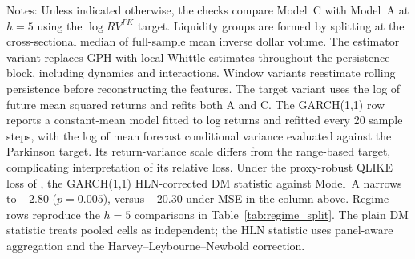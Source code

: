 \begin{table}[p]
\centering
\caption{Robustness Summary: Model~C Relative to Model~A at $h=5$}
\label{tab:robustness}
\small
\setlength{\tabcolsep}{3pt}
\begin{tablenotes}\small
\item Notes: Unless indicated otherwise, the checks compare Model~C with
Model~A at $h=5$ using the $\log RV^{PK}$ target. Liquidity groups are formed
by splitting at the cross-sectional median of full-sample mean inverse
dollar volume. The estimator variant replaces GPH with local-Whittle
estimates throughout the persistence block, including dynamics and
interactions. Window variants reestimate rolling persistence before
reconstructing the features. The target variant uses the log of future
mean squared returns and refits both A and C. The GARCH(1,1) row reports a
constant-mean model fitted to log returns and refitted every 20 sample
steps, with the log of mean forecast conditional variance evaluated against
the Parkinson target. Its return-variance scale differs from the
range-based target, complicating interpretation of its relative loss. Under
the proxy-robust QLIKE loss of \citet{patton2011volatility}, the GARCH(1,1)
HLN-corrected DM statistic against Model~A narrows to $-2.80$ ($p=0.005$),
versus $-20.30$ under MSE in the column above.
Regime rows reproduce the $h=5$ comparisons in
Table~\ref{tab:regime_split}. The plain DM statistic treats pooled cells
as independent; the HLN statistic uses panel-aware aggregation and the
Harvey--Leybourne--Newbold correction.
\end{tablenotes}
\end{table}
